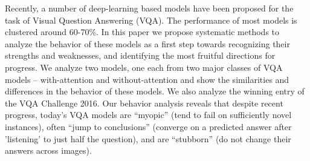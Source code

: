 Recently, a number of deep-learning based models have been proposed for the task of Visual Question Answering (VQA). The performance of most models is clustered around 60-70\%. In this paper we propose systematic methods to analyze the behavior of these models as a first step towards recognizing their strengths and weaknesses, and identifying the most fruitful directions for progress. We analyze two models, one each from two major classes of VQA models -- with-attention and without-attention and show the similarities and differences in the behavior of these models. We also analyze the winning entry of the VQA Challenge 2016. Our behavior analysis reveals that despite recent progress, today's VQA models are ``myopic'' (tend to fail on sufficiently novel instances), often ``jump to conclusions'' (converge on a predicted answer after 'listening' to just half the question), and are ``stubborn'' (do not change their answers across images).
